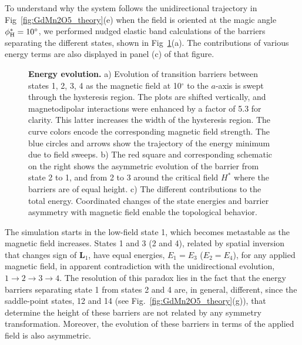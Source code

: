 To understand why the system follows the unidirectional trajectory in Fig~\ref{fig:GdMn2O5_theory}(e) when the field is oriented at the magic angle $\phi_{\rm H}^\ast=10^\circ$, we performed nudged elastic band calculations of the barriers separating the different states, shown in Fig~\ref{fig:GdMn2O5_neb}(a).
The contributions of various energy terms are also displayed in panel (c) of that figure.
\begin{figure}[b!]
	\begin{subfigure}{\textwidth}
	\end{subfigure}
    \caption{\label{fig:GdMn2O5_neb}{\bf Energy evolution.}
    a) Evolution of transition barriers between states 1, 2, 3, 4 as the magnetic field at 10$^\circ$ to the $a$-axis is swept through the hysteresis region. The plots are shifted vertically, and magnetodipolar interactions were enhanced by a factor of 5.3 for clarity. This latter increases the width of the hysteresis region. The curve colors encode the corresponding magnetic field strength. The blue circles and arrows show the trajectory of the energy minimum due to field sweeps.
    b) The red square and corresponding schematic on the right shows the asymmetric evolution of the barrier from state 2 to 1, and from 2 to 3 around the critical field $H^\ast$ where the barriers are of equal height.
    c) The different contributions to the total energy. 
    Coordinated changes of the state energies and barrier asymmetry with magnetic field enable the topological behavior.
    }
\end{figure}
%
The simulation starts in the low-field state 1, which becomes metastable as the magnetic field increases. 
States 1 and 3 (2 and 4), related by spatial inversion that changes sign of $\mathbf{L}_1$, have equal energies, $E_1 = E_3$ ($E_2 = E_4$), for any applied magnetic field, in apparent contradiction with the unidirectional evolution, $1 \rightarrow 2 \rightarrow 3 \rightarrow 4$.
%
The resolution of this paradox lies in the fact that the energy barriers separating state 1 from states 2 and 4 are, in general, different, since the saddle-point states, 12 and 14 (see Fig.~\ref{fig:GdMn2O5_theory}(g)), that determine the height of these barriers are not related by any symmetry transformation.
Moreover, the evolution of these barriers in terms of the applied field is also asymmetric.


